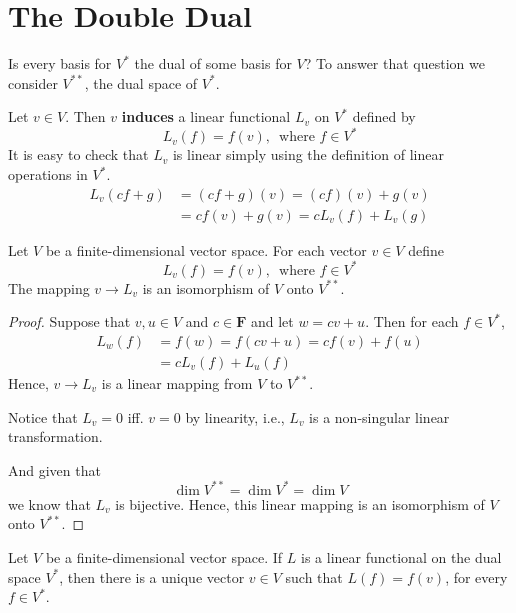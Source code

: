 \section{The Double Dual}

Is every basis for $V^\ast$ the dual of some basis for $V$? To answer that question we consider $V^{\ast \ast}$, the dual space of $V^\ast$.
	
Let $v \in V$. Then $v$ \textbf{induces} a linear functional $L_v$ on $V^\ast$ defined by
\[
	L_v(f) = f(v), \, \text{ where } f \in V^\ast
\]
It is easy to check that $L_v$ is linear simply using the definition of linear operations in $V^\ast$.
\begin{equation*}
	\begin{aligned}
		L_v(cf + g) &= (cf+g)(v) = (cf)(v) + g(v) \\
					&= cf(v) + g(v) = cL_v(f) + L_v(g)
	\end{aligned}
\end{equation*}

\begin{theorem}
	Let $V$ be a finite-dimensional vector space. For each vector $v \in V$ define
	\[
		L_v(f) = f(v), \, \text{ where } f \in V^\ast
	\]
	The mapping $v \longrightarrow L_v$ is an isomorphism of $V$ onto $V^{\ast \ast}$.
\end{theorem}

\begin{proof}
	Suppose that $v, u \in V$ and $c \in \textbf{F}$ and let $w = cv + u$. Then for each $f \in V^\ast$,
	\begin{equation*}
		\begin{aligned}
			L_w(f) &= f(w) = f(cv + u) = cf(v) + f(u) \\
				   &= cL_v(f) + L_u(f)
		\end{aligned}
	\end{equation*}
	Hence, $v \longrightarrow L_v$ is a linear mapping from $V$ to $V^{\ast \ast}$.

	Notice that $L_v = 0$ iff. $v = 0$ by linearity, i.e., $L_v$ is a non-singular linear transformation.

	And given that 
	\[
		\dim V^{\ast \ast} = \dim V^\ast = \dim V
	\]
	we know that $L_v$ is bijective. Hence, this linear mapping is an isomorphism of $V$ onto $V^{\ast \ast}$.
\end{proof}

\begin{corollary}
	Let $V$ be a finite-dimensional vector space. If $L$ is a linear functional on the dual space $V^\ast$, then there is a unique vector $v \in V$ such that $L(f) = f(v)$, for every $f \in V^\ast$.
\end{corollary}

